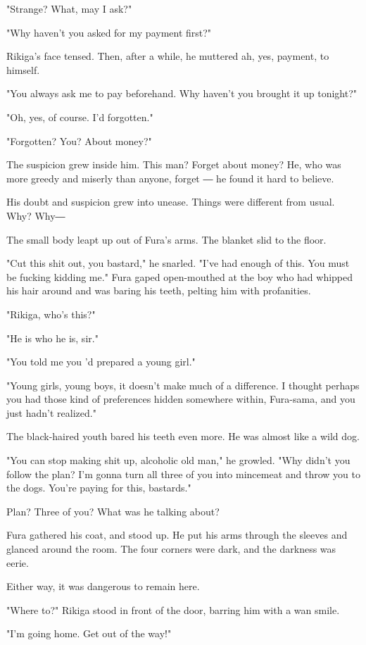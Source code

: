 "Strange? What, may I ask?"

"Why haven't you asked for my payment first?"

Rikiga's face tensed. Then, after a while, he muttered ah, yes, payment,
to himself.

"You always ask me to pay beforehand. Why haven't you brought it up
tonight?"

"Oh, yes, of course. I'd forgotten."

"Forgotten? You? About money?"

The suspicion grew inside him. This man? Forget about money? He, who was
more greedy and miserly than anyone, forget ― he found it hard to
believe.

His doubt and suspicion grew into unease. Things were different from
usual. Why? Why―

The small body leapt up out of Fura's arms. The blanket slid to the
floor.

"Cut this shit out, you bastard," he snarled. "I've had enough of this.
You must be fucking kidding me." Fura gaped open-mouthed at the boy who
had whipped his hair around and was baring his teeth, pelting him with
profanities.

"Rikiga, who's this?"

"He is who he is, sir."

"You told me you 'd prepared a young girl."

"Young girls, young boys, it doesn't make much of a difference. I
thought perhaps you had those kind of preferences hidden somewhere
within, Fura-sama, and you just hadn't realized."

The black-haired youth bared his teeth even more. He was almost like a
wild dog.

"You can stop making shit up, alcoholic old man," he growled. "Why
didn't you follow the plan? I'm gonna turn all three of you into
mincemeat and throw you to the dogs. You're paying for this, bastards."

Plan? Three of you? What was he talking about?

Fura gathered his coat, and stood up. He put his arms through the
sleeves and glanced around the room. The four corners were dark, and the
darkness was eerie.

Either way, it was dangerous to remain here.

"Where to?" Rikiga stood in front of the door, barring him with a wan
smile.

"I'm going home. Get out of the way!"

